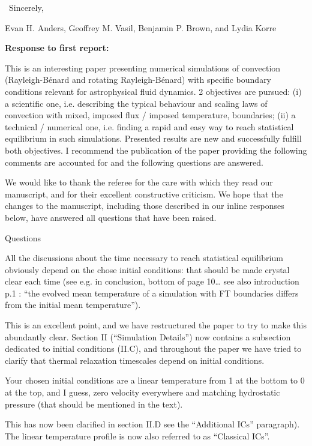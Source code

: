 \documentclass[aps, 11pt, singlecolumn]{revtex4-1} %
\begin{document}
\begin{singlespace}
$\,$\newline
\noindent
Sincerely,

Evan H. Anders, Geoffrey M. Vasil, Benjamin P. Brown, and Lydia Korre



\newpage
\noindent
\Large{\textbf{Response to first report:}}\newline$\,$\newline\indent

\begin{myquotation}
This is an interesting paper presenting numerical simulations of convection (Rayleigh-B\'{e}nard and rotating Rayleigh-B\'{e}nard) with specific boundary conditions relevant for astrophysical fluid dynamics. 
2 objectives are pursued: (i) a scientific one, i.e. describing the typical behaviour and scaling laws of convection with mixed, imposed flux / imposed temperature, boundaries; (ii) a technical / numerical one, i.e. finding a rapid and easy way to reach statistical equilibrium in such simulations. 
Presented results are new and successfully fulfill both objectives. 
I recommend the publication of the paper providing the following comments are accounted for and the following questions are answered.
\end{myquotation}

We would like to thank the referee for the care with which they read our manuscript, and for their excellent constructive criticism.
We hope that the changes to the manuscript, including those described in our inline responses below, have answered all questions that have been raised.


\begin{myquotation}
Questions

All the discussions about the time necessary to reach statistical equilibrium obviously depend on the chose initial conditions: that should be made crystal clear each time (see e.g. in conclusion, bottom of page 10… see also introduction p.1 : ``the evolved mean temperature of a simulation with FT boundaries differs from the initial mean temperature'').
\end{myquotation}
This is an excellent point, and we have restructured the paper to try to make this abundantly clear.
Section II (``Simulation Details'') now contains a subsection dedicated to initial conditions (II.C), and throughout the paper we have tried to clarify that thermal relaxation timescales depend on initial conditions.

\begin{myquotation}
Your chosen initial conditions are a linear temperature from 1 at the bottom to 0 at the top, and I guess, zero velocity everywhere and matching hydrostatic pressure (that should be mentioned in the text). 
\end{myquotation}
This has now been clarified in section II.D see the ``Additional ICs'' paragraph).
The linear temperature profile is now also referred to as ``Classical ICs''.


\end{singlespace}
\end{document}
